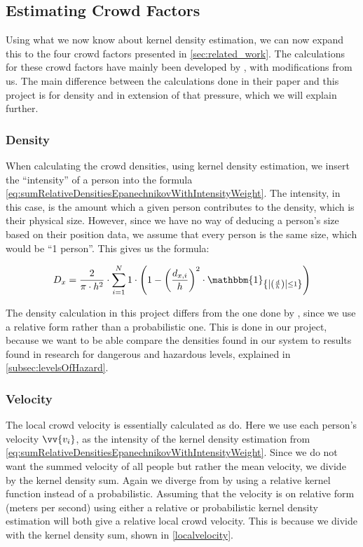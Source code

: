 \subsection{Estimating Crowd Factors}
\label{subsec:estimatingCrowdFactors}
Using what we now know about kernel density estimation, we can now expand this to the four crowd factors presented in \cref{sec:related_work}. The calculations for these crowd factors have mainly been developed by \citet{wirz2012inferring}, with modifications from us. The main difference between the calculations done in their paper and this project is for density and in extension of that pressure, which we will explain further.

\subsubsection{Density}
When calculating the crowd densities, using kernel density estimation, we insert the \enquote{intensity} of a person into the formula \cref{eq:sumRelativeDensitiesEpanechnikovWithIntensityWeight}. The intensity, in this case, is the amount which a given person contributes to the density, which is their physical size. However, since we have no way of deducing a person's size based on their position data, we assume that every person is the same size, which would be \enquote{1 person}. This gives us the formula:

\begin{equation}
D_x = \frac{2}{\pi \cdot h^2} \cdot \sum_{i=1}^N 1 \cdot \left(1-\left(\frac{d_{x,i}}{h}\right)^2 \cdot \mathbbm{1}_{\left\{\left|\left(\frac{d}{h}\right)\right| \leq 1\right\}}\right)
\end{equation}

The density calculation in this project differs from the one done by \citet{wirz2012inferring}, since we use a relative form rather than a probabilistic one. This is done in our project, because we want to be able compare the densities found in our system to results found in research for dangerous and hazardous levels, explained in \cref{subsec:levelsOfHazard}.

\subsubsection{Velocity}
The local crowd velocity is essentially calculated as \citet{wirz2012inferring} do. Here we use each person's velocity $\vv{v_i}$, as the intensity of the kernel density estimation from \cref{eq:sumRelativeDensitiesEpanechnikovWithIntensityWeight}. Since we do not want the summed velocity of all people but rather the mean velocity, we divide by the kernel density sum. Again we diverge from \citet{wirz2012inferring} by using a relative kernel function instead of a probabilistic. Assuming that the velocity is on relative form (meters per second) using either a relative or probabilistic kernel density estimation will both give a relative local crowd velocity. This is because we divide with the kernel density sum, shown in \cref{localvelocity}.

